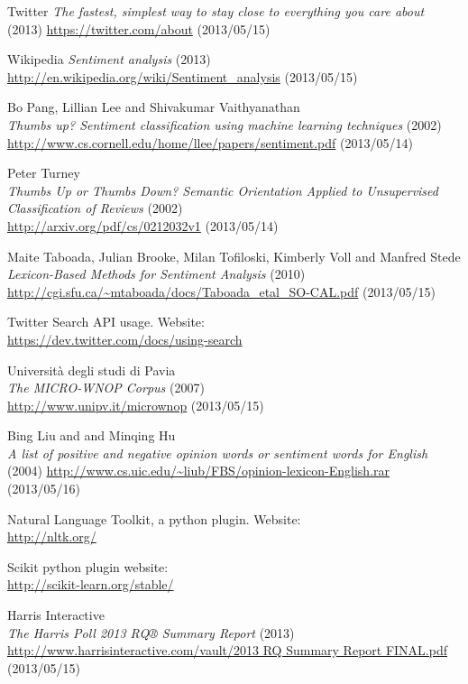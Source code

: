 \documentclass[a4paper,12pt]{report}
\begin{document}
\begin{thebibliography}{9}


  Twitter
  \emph{The fastest, simplest way to stay close to everything you care about} (2013)
  \url{https://twitter.com/about} (2013/05/15)

  Wikipedia
  \emph{Sentiment analysis} (2013)
  \url{http://en.wikipedia.org/wiki/Sentiment_analysis} (2013/05/15)

  Bo Pang, Lillian Lee and Shivakumar Vaithyanathan\\
  \emph{Thumbs up? Sentiment classification using machine learning techniques} (2002)\\
  \url{http://www.cs.cornell.edu/home/llee/papers/sentiment.pdf} (2013/05/14)

  Peter Turney\\
  \emph{Thumbs Up or Thumbs Down? Semantic Orientation Applied to Unsupervised Classification of Reviews} (2002)\\
  \url{http://arxiv.org/pdf/cs/0212032v1} (2013/05/14)

  Maite Taboada, Julian Brooke, Milan Tofiloski, Kimberly Voll and Manfred Stede\\
  \emph{Lexicon-Based Methods for Sentiment Analysis} (2010)\\
  \url{http://cgi.sfu.ca/~mtaboada/docs/Taboada_etal_SO-CAL.pdf} (2013/05/15)

  Twitter Search API usage. Website:\\
  \url{https://dev.twitter.com/docs/using-search}

  Università degli studi di Pavia\\
  \emph{The MICRO-WNOP Corpus} (2007)\\
  \url{http://www.unipv.it/micrownop} (2013/05/15)
  
  Bing Liu and and Minqing Hu\\
  \emph{A list of positive and negative opinion words or sentiment words for English} (2004)
  \url{http://www.cs.uic.edu/~liub/FBS/opinion-lexicon-English.rar} (2013/05/16)

  Natural Language Toolkit, a python plugin. Website:\\
  \url{http://nltk.org/}
  
  Scikit python plugin website:\\
  \url{http://scikit-learn.org/stable/}

  Harris Interactive\\
  \emph{The Harris Poll 2013 RQ® Summary Report} (2013)\\
  \url{http://www.harrisinteractive.com/vault/2013 RQ Summary Report FINAL.pdf} (2013/05/15)

\end{thebibliography}
\end{document}
